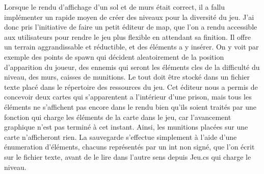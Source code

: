 \documentclass[12pt]{article}
\begin{document}
\par
Lorsque le rendu d’affichage d’un sol et de murs était correct, il a fallu implémenter un rapide moyen de créer des niveaux pour la diversité du jeu. J’ai donc pris l’initiative de faire un petit éditeur de map, que l’on a rendu accessible aux utilisateurs pour rendre le jeu plus flexible en attendant sa finition. Il offre un terrain aggrandissable et réductible, et des éléments a y insérer. On y voit par exemple des points de spawn qui décident aleatoirement de la position d’apparition du joueur, des ennemis qui seront les éléments cles de la difficulté du niveau, des murs, caisses de munitions. Le tout doit être stocké dans un fichier texte placé dans le répertoire des ressources du jeu. Cet éditeur nous a permis de concevoir deux cartes qui s’apparentent a l’intérieur d’une prison, mais tous les éléments ne s’affichent pas encore dans le rendu bien qu’ils soient traités par une fonction qui charge les éléments de la carte dans le jeu, car l’avancement graphique n’est pas terminé à cet instant. Ainsi, les munitions placées sur une carte n’afficheront rien. La sauvegarde s’effectue simplement à l’aide d’une énumeration d’éléments, chacuns représentés par un int non signé, que l’on écrit sur le fichier texte, avant de le lire dans l’autre sens depuis Jeu.cs qui charge le niveau.
\end{document}

